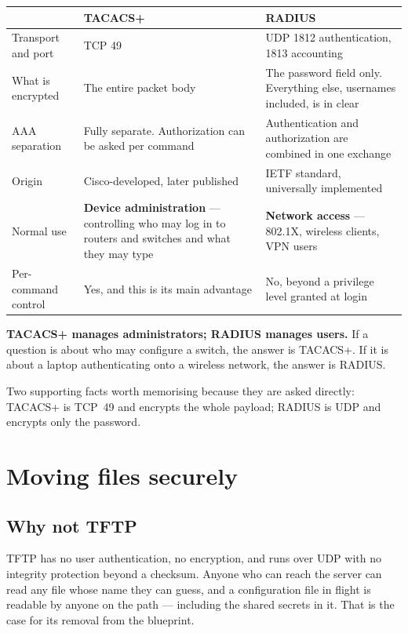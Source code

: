 \begin{longtable}{@{}L{3.5cm}L{5.6cm}L{5.8cm}@{}}
\toprule
{}
\textbf{} & \textbf{TACACS+} & \textbf{RADIUS} \\
\midrule
\endhead
Transport and port & TCP 49 & UDP 1812 authentication, 1813 accounting \\
What is encrypted & The entire packet body & The password field only.
Everything else, usernames included, is in clear \\
AAA separation & Fully separate. Authorization can be asked per command &
Authentication and authorization are combined in one exchange \\
Origin & Cisco-developed, later published & IETF standard, universally
implemented \\
Normal use & \textbf{Device administration} --- controlling who may log in to
routers and switches and what they may type &
\textbf{Network access} --- 802.1X, wireless clients, VPN users \\
Per-command control & Yes, and this is its main advantage &
No, beyond a privilege level granted at login \\
\bottomrule
\end{longtable}

\begin{examnote}
\textbf{TACACS+ manages administrators; RADIUS manages users.} If a question is
about who may configure a switch, the answer is TACACS+. If it is about a laptop
authenticating onto a wireless network, the answer is RADIUS.

Two supporting facts worth memorising because they are asked directly: TACACS+ is
TCP~49 and encrypts the whole payload; RADIUS is UDP and encrypts only the
password.
\end{examnote}

\section{Moving files securely}

\subsection{Why not TFTP}

TFTP has no user authentication, no encryption, and runs over UDP with no
integrity protection beyond a checksum. Anyone who can reach the server can read
any file whose name they can guess, and a configuration file in flight is
readable by anyone on the path --- including the shared secrets in it. That is
the case for its removal from the blueprint.

